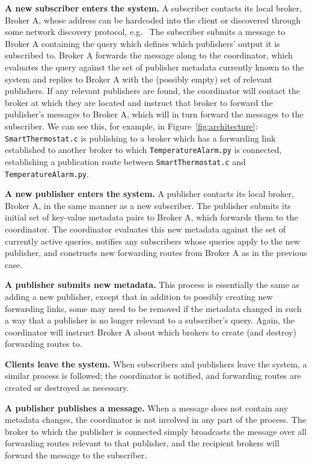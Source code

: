 \textbf{A new subscriber enters the system.}
A subscriber contacts its local broker, Broker A, whose address can be hardcoded into the client or discovered through some network discovery protocol, e.g.\ %
The subscriber submits a message to Broker A containing the query which defines which publishers' output it is subscribed to.
Broker A forwards the message along to the coordinator, which evaluates the query against the set of publisher metadata currently known to the system and replies to Broker A with the (possibly empty) set of relevant publishers.
If any relevant publishers are found, the coordinator will contact the broker at which they are located and instruct that broker to forward the publisher's messages to Broker A, which will in turn forward the messages to the subscriber.
We can see this, for example, in Figure~\ref{fig:architecture}: \texttt{SmartThermostat.c} is publishing to a broker which has a forwarding link established to another broker to which \texttt{TemperatureAlarm.py} is connected, establishing a publication route between \texttt{SmartThermostat.c} and \texttt{TemperatureAlarm.py}.

\textbf{A new publisher enters the system.}
A publisher contacts its local broker, Broker A, in the same manner as a new subscriber.
The publisher submits its initial set of key-value metadata pairs to Broker A, which forwards them to the coordinator.
The coordinator evaluates this new metadata against the set of currently active queries, notifies any subscribers whose queries apply to the new publisher, and constructs new forwarding routes from Broker A as in the previous case.

\textbf{A publisher submits new metadata.}
This process is essentially the same as adding a new publisher, except that in addition to possibly creating new forwarding links, some may need to be removed if the metadata changed in such a way that a publisher is no longer relevant to a subscriber's query.
Again, the coordinator will instruct Broker A about which brokers to create (and destroy) forwarding routes to.

\textbf{Clients leave the system.}
When subscribers and publishers leave the system, a similar process is followed; the coordinator is notified, and forwarding routes are created or destroyed as necessary.

\textbf{A publisher publishes a message.}
When a message does not contain any metadata changes, the coordinator is not involved in any part of the process.
The broker to which the publisher is connected simply broadcasts the message over all forwarding routes relevant to that publisher, and the recipient brokers will forward the message to the subscriber.

